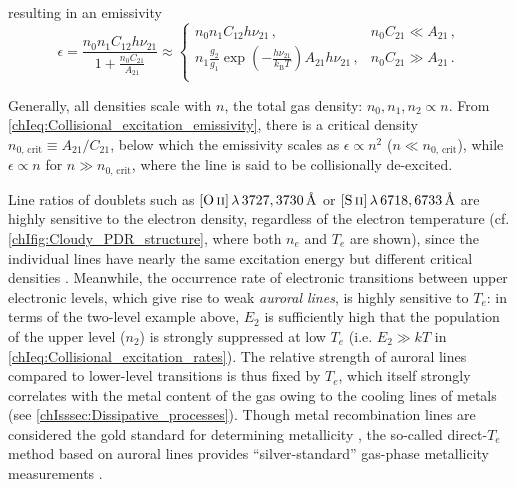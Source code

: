 \noindent resulting in an emissivity
\begin{equation}
    \label{chIeq:Collisional_excitation_emissivity}
    \epsilon = \frac{n_0 n_1 C_{12} h \nu_{21}}{1 + \frac{n_0 C_{21}}{A_{21}}} \approx \left\{
    \begin{array}{ll}
         n_0 n_1 C_{12} h \nu_{21} \, , & n_0 C_{21} \ll A_{21} \, , \\
        
         n_1 \frac{g_2}{g_1} \exp \left( - \frac{h \nu_{21}}{k_\text{B} T} \right) A_{21} h \nu_{21} \, , & n_0 C_{21} \gg A_{21} \, . \\
    \end{array}
    \right.
\end{equation}

Generally, all densities scale with $n$, the total gas density: $n_0, n_1, n_2 \propto n$. From \cref{chIeq:Collisional_excitation_emissivity}, there is a critical density $n_{0, \, \text{crit}} \equiv A_{21}/C_{21}$, below which the emissivity scales as $\epsilon \propto n^2$ ($n \ll n_{0, \, \text{crit}}$), while $\epsilon \propto n$ for $n \gg n_{0, \, \text{crit}}$, where the line is said to be collisionally de-excited.

Line ratios of doublets such as $\OII \, \lambda \, 3727, 3730 \, \Angstrom$ or $\SII \, \lambda \, 6718, 6733 \, \Angstrom$ are highly sensitive to the electron density, regardless of the electron temperature (cf. \cref{chIfig:Cloudy_PDR_structure}, where both $n_e$ and $T_e$ are shown), since the individual lines have nearly the same excitation energy but different critical densities . Meanwhile, the occurrence rate of electronic transitions between upper electronic levels, which give rise to weak \textit{auroral lines}, is highly sensitive to $T_e$: in terms of the two-level example above, $E_2$ is sufficiently high that the population of the upper level ($n_2$) is strongly suppressed at low $T_e$ (i.e. $E_2 \gg kT$ in \cref{chIeq:Collisional_excitation_rates}). The relative strength of auroral lines compared to lower-level transitions is thus fixed by $T_e$, which itself strongly correlates with the metal content of the gas owing to the cooling lines of metals (see \cref{chIsssec:Dissipative_processes}). Though metal recombination lines are considered the gold standard for determining metallicity \citep[yet are practically unviable for distant galaxies;][]{2019ARA&A..57..511K}, the so-called direct-$T_e$ method based on auroral lines provides ``silver-standard'' gas-phase metallicity measurements \citep[e.g.][]{2016ApJ...825L..23S, 2021ApJ...914...19S, 2017MNRAS.465.1384C, 2022arXiv220712375C}.

